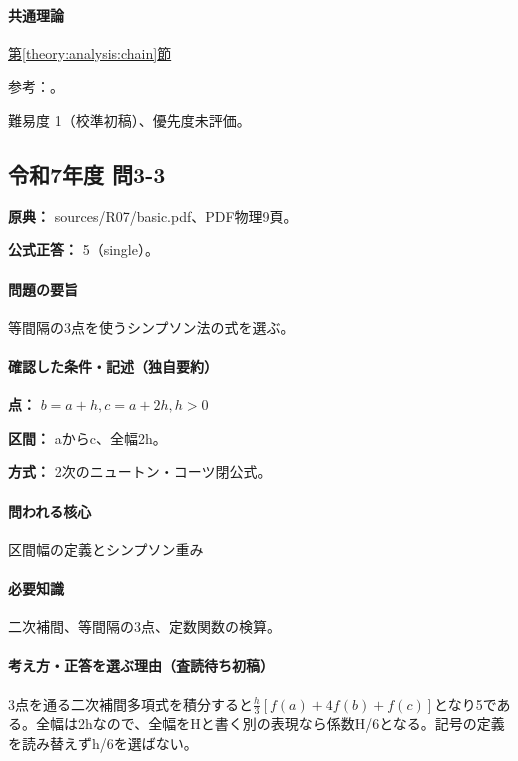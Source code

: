 \paragraph{共通理論} \hyperref[theory:analysis:chain]{第\ref*{theory:analysis:chain}節}

\par 参考：\cite{mit_chain2007}。

\par 難易度 1（校準初稿）、優先度未評価。

\subsection{令和7年度 問3-3}
\label{q:r07-reg-basic-3-3}

\noindent\textbf{原典：} sources/R07/basic.pdf、PDF物理9頁。

\textbf{公式正答：} 5（single）。

\paragraph{問題の要旨} 等間隔の3点を使うシンプソン法の式を選ぶ。

\paragraph{確認した条件・記述（独自要約）}\mbox{}\par

\noindent\textbf{点：} \(b=a+h,c=a+2h,h>0\)\par

\noindent\textbf{区間：} aからc、全幅2h。\par

\noindent\textbf{方式：} 2次のニュートン・コーツ閉公式。\par

\paragraph{問われる核心} 区間幅の定義とシンプソン重み

\paragraph{必要知識} 二次補間、等間隔の3点、定数関数の検算。

\paragraph{考え方・正答を選ぶ理由（査読待ち初稿）} 3点を通る二次補間多項式を積分すると\(\frac h3[f(a)+4f(b)+f(c)]\)となり5である。全幅は2hなので、全幅をHと書く別の表現なら係数H/6となる。記号の定義を読み替えずh/6を選ばない。

